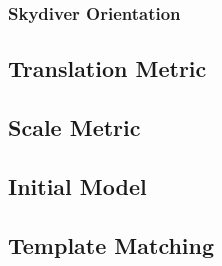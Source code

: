 \documentclass[a4paper, 12pt]{article}
\begin{document}
		\subsubsection{Skydiver Orientation}
	\subsection{Translation Metric}
	\subsection{Scale Metric}
	\subsection{Initial Model}
	\subsection{Template Matching}
\end{document}
